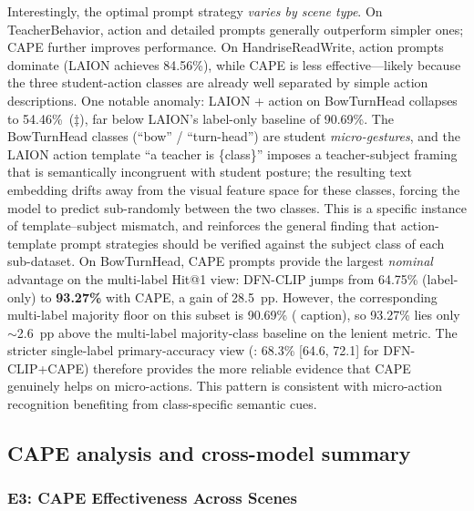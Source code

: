 \documentclass[electronics,article,submit,pdftex,moreauthors]{Definitions/mdpi}
\begin{document}
Interestingly, the optimal prompt strategy \emph{varies by scene type}.
On TeacherBehavior, action and detailed prompts generally outperform simpler ones; CAPE further improves performance.
On HandriseReadWrite, action prompts dominate (LAION achieves 84.56\%), while CAPE is less effective---likely because the three student-action classes are already well separated by simple action descriptions.
One notable anomaly: LAION + action on BowTurnHead collapses to 54.46\%~($\ddagger$), far below LAION's label-only baseline of 90.69\%.
The BowTurnHead classes (``bow'' / ``turn-head'') are student \emph{micro-gestures}, and the LAION action template ``a teacher is \{class\}'' imposes a teacher-subject framing that is semantically incongruent with student posture; the resulting text embedding drifts away from the visual feature space for these classes, forcing the model to predict sub-randomly between the two classes.
This is a specific instance of template--subject mismatch, and reinforces the general finding that action-template prompt strategies should be verified against the subject class of each sub-dataset.
On BowTurnHead, CAPE prompts provide the largest \emph{nominal} advantage on the multi-label Hit@1 view: DFN-CLIP jumps from 64.75\% (label-only) to \textbf{93.27\%} with CAPE, a gain of 28.5~pp. However, the corresponding multi-label majority floor on this subset is 90.69\% ( caption), so 93.27\% lies only $\sim$2.6~pp above the multi-label majority-class baseline on the lenient metric. The stricter single-label primary-accuracy view (: 68.3\% [64.6, 72.1] for DFN-CLIP+CAPE) therefore provides the more reliable evidence that CAPE genuinely helps on micro-actions.
This pattern is consistent with micro-action recognition benefiting from class-specific semantic cues.

\subsection{CAPE analysis and cross-model summary}

\subsubsection{E3: CAPE Effectiveness Across Scenes}
\label{sec:e3}
\end{document}
